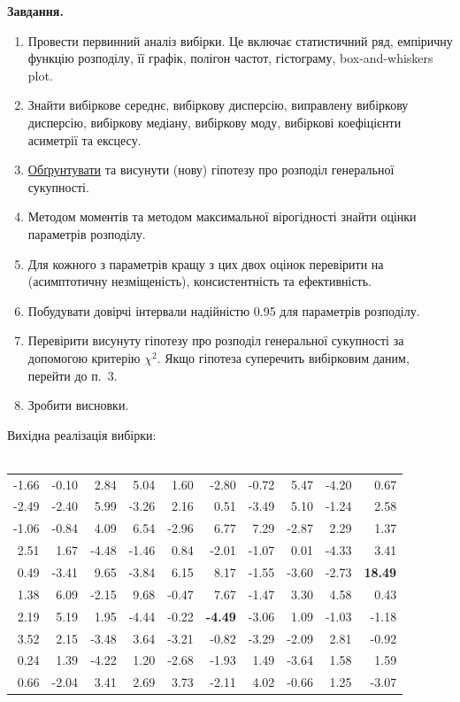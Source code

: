 \documentclass[14pt,a4paper]{scrartcl}
\begin{document}
\newpage
\textbf{Завдання.}\\
\begin{enumerate}
  \item Провести первинний аналіз вибірки. Це включає статистичний ряд, емпіричну функцію розподілу, її графік, полігон частот, гістограму, box-and-whiskers plot.
  \item Знайти вибіркове середнє, вибіркову дисперсію, виправлену вибіркову дисперсію, вибіркову медіану, вибіркову моду, вибіркові коефіцієнти асиметрії та ексцесу.
  \item \underline{Обґрунтувати} та висунути (нову) гіпотезу про розподіл генеральної сукупності.
  \item Методом моментів та методом максимальної вірогідності знайти оцінки параметрів розподілу.
  \item Для кожного з параметрів кращу з цих двох оцінок перевірити на (асимптотичну незміщеність), консистентність та ефективність.
  \item Побудувати довірчі інтервали надійністю 0.95 для параметрів розподілу.
  \item Перевірити висунуту гіпотезу про розподіл генеральної сукупності за допомогою критерію $\chi^2$. Якщо гіпотеза суперечить вибірковим даним, перейти до п.~3.
  \item Зробити висновки.
\end{enumerate}
\newpage

Вихідна реалізація вибірки:\\\\
\begin{tabular}{r r r r r r r r r r}
-1.66 & -0.10 & 2.84 & 5.04 & 1.60 & -2.80 & -0.72 & 5.47 & -4.20 & 0.67\\
-2.49 & -2.40 & 5.99 & -3.26 & 2.16 & 0.51 & -3.49 & 5.10 & -1.24 & 2.58\\
-1.06 & -0.84 & 4.09 & 6.54 & -2.96 & 6.77 & 7.29 & -2.87 & 2.29 & 1.37\\
2.51 & 1.67 & -4.48 & -1.46 & 0.84 & -2.01 & -1.07 & 0.01 & -4.33 & 3.41\\
0.49 & -3.41 & 9.65 & -3.84 & 6.15 & 8.17 & -1.55 & -3.60 & -2.73 & \textbf{18.49}\\
1.38 & 6.09 & -2.15 & 9.68 & -0.47 & 7.67 & -1.47 & 3.30 & 4.58 & 0.43\\
2.19 & 5.19 & 1.95 & -4.44 & -0.22 & \textbf{-4.49} & -3.06 & 1.09 & -1.03 & -1.18\\
3.52 & 2.15 & -3.48 & 3.64 & -3.21 & -0.82 & -3.29 & -2.09 & 2.81 & -0.92\\
0.24 & 1.39 & -4.22 & 1.20 & -2.68 & -1.93 & 1.49 & -3.64 & 1.58 & 1.59\\
0.66 & -2.04 & 3.41 & 2.69 & 3.73 & -2.11 & 4.02 & -0.66 & 1.25 & -3.07
\end{tabular}\\\\
\end{document}
